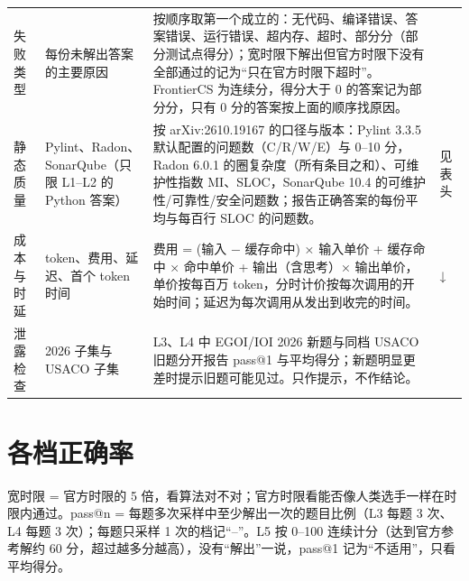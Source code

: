 \documentclass[11pt,a4paper,fontset=none]{ctexart}
\begin{document}
{\begin{longtable}{@{}p{1.6cm}p{2.6cm}p{9.9cm}p{1.2cm}@{}}
失败类型 & 每份未解出答案的主要原因 & 按顺序取第一个成立的：无代码、编译错误、答案错误、运行错误、超内存、超时、部分分（部分测试点得分）；宽时限下解出但官方时限下没有全部通过的记为“只在官方时限下超时”。FrontierCS 为连续分，得分大于 0 的答案记为部分分，只有 0 分的答案按上面的顺序找原因。 &  \\
静态质量 & Pylint、Radon、SonarQube（只限 L1–L2 的 Python 答案） & 按 arXiv:2610.19167 的口径与版本：Pylint 3.3.5 默认配置的问题数（C/R/W/E）与 0–10 分，Radon 6.0.1 的圈复杂度（所有条目之和）、可维护性指数 MI、SLOC，SonarQube 10.4 的可维护性/可靠性/安全问题数；报告正确答案的每份平均与每百行 SLOC 的问题数。 & 见表头 \\
成本与时延 & token、费用、延迟、首个 token 时间 & 费用 = (输入 − 缓存命中) × 输入单价 + 缓存命中 × 命中单价 + 输出（含思考）× 输出单价，单价按每百万 token，分时计价按每次调用的开始时间；延迟为每次调用从发出到收完的时间。 & ↓ \\
泄露检查 & 2026 子集与 USACO 子集 & L3、L4 中 EGOI/IOI 2026 新题与同档 USACO 旧题分开报告 pass@1 与平均得分；新题明显更差时提示旧题可能见过。只作提示，不作结论。 &  \\
\bottomrule
\end{longtable}}
\section{各档正确率}
\begin{center}\small
{}
\end{center}
宽时限 = 官方时限的 5 倍，看算法对不对；官方时限看能否像人类选手一样在时限内通过。pass@n = 每题多次采样中至少解出一次的题目比例（L3 每题 3 次、L4 每题 3 次）；每题只采样 1 次的档记“–”。L5 按 0–100 连续计分（达到官方参考解约 60 分，超过越多分越高），没有“解出”一说，pass@1 记为“不适用”，只看平均得分。
\end{document}
